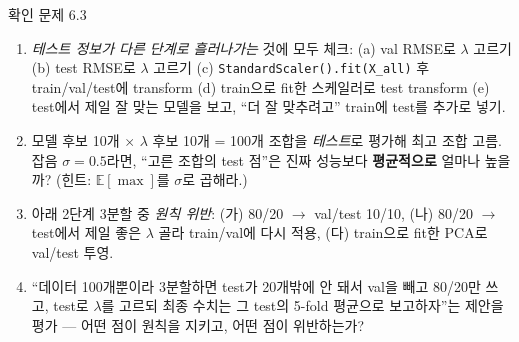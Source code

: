 \begin{frame}{확인 문제 6.3}
  \small
  \begin{enumerate}
    \item \emph{테스트 정보가 다른 단계로 흘러나가는} 것에 모두 체크:
      (a) val RMSE로 $\lambda$ 고르기 (b) test RMSE로 $\lambda$ 고르기
      (c) \texttt{StandardScaler().fit(X\_all)} 후 train/val/test에
      transform (d) train으로 fit한 스케일러로 test transform
      (e) test에서 제일 잘 맞는 모델을 보고, ``더 잘 맞추려고'' train에
      test를 추가로 넣기.
    \item 모델 후보 10개 $\times$ $\lambda$ 후보 10개 = 100개 조합을
      \emph{테스트}로 평가해 최고 조합 고름. 잡음 $\sigma=0.5$라면,
      ``고른 조합의 test 점''은 진짜 성능보다 \textbf{평균적으로} 얼마나
      높을까? (힌트: $\mathbb{E}[\max]$를 $\sigma$로 곱해라.)
    \item 아래 2단계 3분할 중 \emph{원칙 위반}: (가) 80/20 $\to$
      val/test 10/10, (나) 80/20 $\to$ test에서 제일 좋은 $\lambda$ 골라
      train/val에 다시 적용, (다) train으로 fit한 PCA로 val/test 투영.
    \item ``데이터 100개뿐이라 3분할하면 test가 20개밖에 안 돼서 val을 빼고
      80/20만 쓰고, test로 $\lambda$를 고르되 최종 수치는 그 test의 5-fold
      평균으로 보고하자''는 제안을 평가 — 어떤 점이 원칙을 지키고, 어떤
      점이 위반하는가?
  \end{enumerate}
\end{frame}

